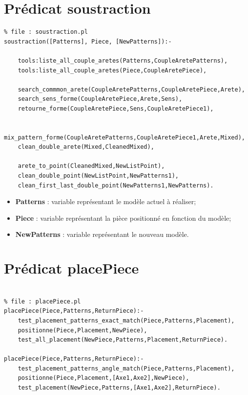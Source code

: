 \documentclass[a4paper, 11pt]{report}
\begin{document}
	\begin{appendices}

    \chapter{Prédicat soustraction}
    \begin{verbatim}
% file : soustraction.pl
soustraction([Patterns], Piece, [NewPatterns]):-

    tools:liste_all_couple_aretes(Patterns,CoupleAretePatterns),
    tools:liste_all_couple_aretes(Piece,CoupleAretePiece),

    search_commmon_arete(CoupleAretePatterns,CoupleAretePiece,Arete),
    search_sens_forme(CoupleAretePiece,Arete,Sens),
    retourne_forme(CoupleAretePiece,Sens,CoupleAretePiece1),

    mix_pattern_forme(CoupleAretePatterns,CoupleAretePiece1,Arete,Mixed),
    clean_double_arete(Mixed,CleanedMixed),

    arete_to_point(CleanedMixed,NewListPoint),
    clean_double_point(NewListPoint,NewPatterns1),
    clean_first_last_double_point(NewPatterns1,NewPatterns).
    \end{verbatim}

    \begin{itemize}
        \item \textbf{Patterns} : variable représentant le modèle actuel à réaliser;
        \item \textbf{Piece} : variable représentant la pièce positionné en fonction du modèle;
        \item \textbf{NewPatterns} : variable représentant le nouveau modèle.
    \end{itemize}

\chapter{Prédicat placePiece}
    \begin{verbatim}

% file : placePiece.pl
placePiece(Piece,Patterns,ReturnPiece):-
    test_placement_patterns_exact_match(Piece,Patterns,Placement),
    positionne(Piece,Placement,NewPiece),
    test_all_placement(NewPiece,Patterns,Placement,ReturnPiece).

placePiece(Piece,Patterns,ReturnPiece):-
    test_placement_patterns_angle_match(Piece,Patterns,Placement),
    positionne(Piece,Placement,[Axe1,Axe2],NewPiece),
    test_placement(NewPiece,Patterns,[Axe1,Axe2],ReturnPiece).


\end{verbatim}
\end{appendices}
\end{document}
